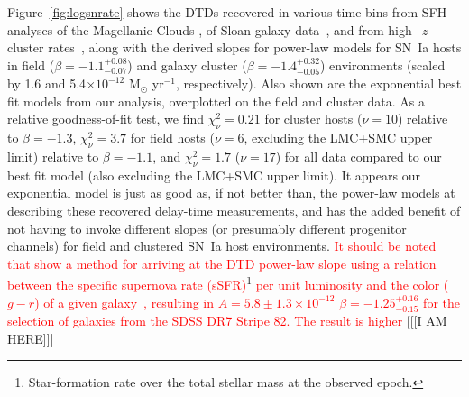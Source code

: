 \documentclass[apj, linenumbers]{aastex62}
\begin{document}
Figure~\ref{fig:logsnrate} shows the DTDs recovered in various time bins from SFH analyses of the Magellanic Clouds \citep{Maoz:2010}, of Sloan galaxy data~\citep{Maoz:2010a, Maoz:2011, Maoz:2012a,Graur:2013}, and from high$-z$ cluster rates~\citep{Friedmann:2018hq}, along with the derived  slopes for power-law models for SN~Ia hosts in field ($\beta=-1.1^{+0.08}_{-0.07}$) and galaxy cluster ($\beta=-1.4^{+0.32}_{-0.05}$) environments (scaled by 1.6 and 5.4$\times10^{-12}$ M$_{\odot}$ yr$^{-1}$, respectively). Also shown are the exponential best fit models from our analysis, overplotted on the field and cluster data. As a relative goodness-of-fit test, we find  $\chi^2_{\nu}=0.21$ for cluster hosts ($\nu=10$) relative to $\beta=-1.3$, $\chi^2_{\nu}=3.7$ for field hosts ($\nu=6$, excluding the LMC+SMC upper limit) relative to $\beta=-1.1$, and $\chi^2_{\nu}=1.7$ ($\nu=17$) for all data compared to our best fit model (also excluding the LMC+SMC upper limit). It appears our exponential model is just as good as, if not better than, the power-law models at describing these recovered delay-time measurements, and has the added benefit of not having to invoke different slopes (or presumably different progenitor channels) for field and clustered SN~Ia host environments. \textcolor{red}{It should be noted that \cite{Heringer:2019ws} show a method for arriving at the DTD power-law slope using a relation between the specific supernova rate (sSFR)\footnote{Star-formation rate over the total stellar mass at the observed epoch.}  per unit luminosity and the color ($g-r$) of a given galaxy~\citep{Heringer:2017fp}, resulting in $A=5.8\pm1.3\times10^{-12}$ $\beta=-1.25^{+0.16}_{-0.15}$ for the selection of galaxies from the SDSS DR7 Stripe 82. The result is higher  }
[[[I AM HERE]]]
\end{document}
